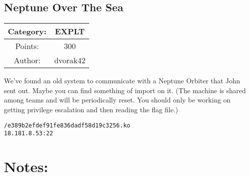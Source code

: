\begin{center}
\section*{Neptune Over The Sea}
{\large
\begin{tabular}{| c c |}
\hline
Category: & EXPLT\\\hline
Points: & 300\\\hline
Author: & dvorak42\\\hline
\end{tabular}
}
\end{center}
\vspace{0.5in}

{\large
We've found an old system to communicate with a Neptune Orbiter that John sent out. Maybe you can find something of import on it. (The machine is shared among teams and will be periodically reset. You should only be working on getting privilege escalation and then reading the flag file.)
}
\vspace{0.25in}
\begin{center}
  {\Large\tt /e389b2efdef91fe836dadf58d19c3256.ko}\\
  {\Large\tt 18.181.8.53:22}
\end{center}

\vspace{0.25in}
\section*{Notes:}
